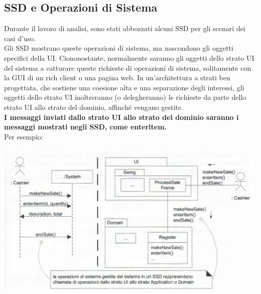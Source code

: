 \documentclass[a4paper,12pt, oneside]{book}
\begin{document}
\subsection{SSD e Operazioni di Sistema}
Durante il lavoro di analisi, sono stati abbozzati alcuni SSD per gli scenari dei casi d'uso.\\
Gli SSD mostrano queste operazioni di sistema, ma nascondono gli oggetti specifici
della UI. Ciononostante, normalmente saranno gli oggetti dello strato UI del sistema
a catturare queste richieste di operazioni di sistema, solitamente con la GUI di un rich
client o una pagina web.
In un'architettura a strati ben progettata, che sostiene una coesione alta e una separazione degli interessi, gli oggetti dello strato UI inoltreranno (o delegheranno) le richieste da
parte dello strato UI allo strato del dominio, affinché vengano gestite.\\
\textbf{I messaggi inviati dallo strato UI allo strato del dominio saranno i messaggi mostrati
  negli SSD, come enterltem.}\\
Per esempio:
\begin{center}
\includegraphics[scale = 0.7]{img/log6.png}
\end{center}
\end{document}
